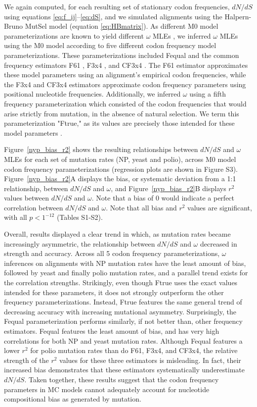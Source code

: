 \documentclass{pnastwo}
\begin{document}
\begin{article}
We again computed, for each resulting set of stationary codon frequencies, $dN/dS$ using equations \eqref{eq:f_ij}--\eqref{eq:dS}, and we simulated alignments using the Halpern-Bruno MutSel model (equation \eqref{eq:HBmatrix}). As different M0 model parameterizations are known to yield different $\omega$ MLEs \cite{ZhangYu2006,Yang2006,Pond2010}, we inferred $\omega$ MLEs using the M0 model according to five different codon frequency model parameterizations. These parameterizations included Fequal \cite{Yang2006} and the common frequency estimators F61 \cite{GoldmanYang1994}, F3x4 \cite{MuseGaut1994}, and CF3x4 \cite{Pond2010}. The F61 estimator approximates these model parameters using an alignment's empirical codon frequencies, while the F3x4 and CF3x4 estimators approximate codon frequency parameters using positional nucleotide frequencies. Additionally, we inferred $\omega$ using a fifth frequency parameterization which consisted of the codon frequencies that would arise strictly from mutation, in the absence of natural selection. We term this parameterization "Ftrue," as its values are precisely those intended for these model parameters \cite{GoldmanYang1994,MuseGaut1994,YN00,Yang2006}.


Figure~\ref{nyp_bias_r2} shows the resulting relationships between $dN/dS$ and $\omega$ MLEs for each set of mutation rates (NP, yeast and polio), across M0 model codon frequency parameterizations (regression plots are shown in Figure S3). Figure~\ref{nyp_bias_r2}A displays the bias, or systematic deviation from a 1:1 relationship, between $dN/dS$ and $\omega$, and Figure~\ref{nyp_bias_r2}B displays $r^2$ values between $dN/dS$ and $\omega$. Note that a bias of 0 would indicate a perfect correlation between $dN/dS$ and $\omega$. Note that all bias and $r^2$ values are significant, with all $p < 1^{-12}$ (Tables S1-S2). 

Overall, results displayed a clear trend in which, as mutation rates became increasingly asymmetric, the relationship between $dN/dS$ and $\omega$ decreased in strength and accuracy. Across all 5 codon frequency parameterizations, $\omega$ inferences on alignments with NP mutation rates have the least amount of bias, followed by yeast and finally polio mutation rates, and a parallel trend exists for the correlation strengths. Strikingly, even though Ftrue uses the exact values intended for these parameters, it does not strongly outperform the other frequency parameterizations. Instead, Ftrue features the same general trend of decreasing accuracy with increasing mutational asymmetry. Surprisingly, the Fequal parameterization performs similarly, if not better than, other frequency estimators. Fequal features the least amount of bias, and has very high correlations for both NP and yeast mutation rates. Although Fequal features a lower $r^2$ for polio mutation rates than do F61, F3x4, and CF3x4, the relative strength of the $r^2 $ values for these three estimators is misleading. In fact, their increased bias demonstrates that these estimators systematically underestimate $dN/dS$. Taken together, these results suggest that the codon frequency parameters in MC models cannot adequately account for nucleotide compositional bias as generated by mutation. 


\end{article}
\end{document}
